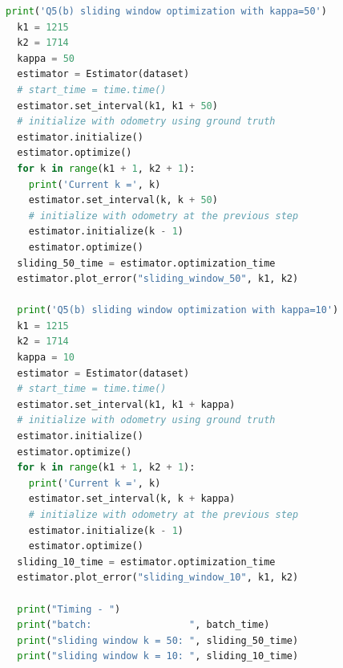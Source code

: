 \documentclass[a4paper]{article}
\begin{document}
\begin{lstlisting}[language=Python, basicstyle=\small, caption=main.py]
  print('Q5(b) sliding window optimization with kappa=50')
  k1 = 1215
  k2 = 1714
  kappa = 50
  estimator = Estimator(dataset)
  # start_time = time.time()
  estimator.set_interval(k1, k1 + 50)
  # initialize with odometry using ground truth
  estimator.initialize()
  estimator.optimize()
  for k in range(k1 + 1, k2 + 1):
    print('Current k =', k)
    estimator.set_interval(k, k + 50)
    # initialize with odometry at the previous step
    estimator.initialize(k - 1)
    estimator.optimize()
  sliding_50_time = estimator.optimization_time
  estimator.plot_error("sliding_window_50", k1, k2)

  print('Q5(b) sliding window optimization with kappa=10')
  k1 = 1215
  k2 = 1714
  kappa = 10
  estimator = Estimator(dataset)
  # start_time = time.time()
  estimator.set_interval(k1, k1 + kappa)
  # initialize with odometry using ground truth
  estimator.initialize()
  estimator.optimize()
  for k in range(k1 + 1, k2 + 1):
    print('Current k =', k)
    estimator.set_interval(k, k + kappa)
    # initialize with odometry at the previous step
    estimator.initialize(k - 1)
    estimator.optimize()
  sliding_10_time = estimator.optimization_time
  estimator.plot_error("sliding_window_10", k1, k2)

  print("Timing - ")
  print("batch:                 ", batch_time)
  print("sliding window k = 50: ", sliding_50_time)
  print("sliding window k = 10: ", sliding_10_time)
\end{lstlisting}
\end{document}
